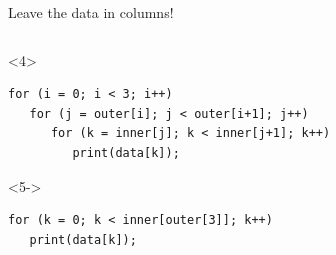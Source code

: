 \documentclass[aspectratio=169]{beamer}
\begin{document}
\begin{frame}[fragile]{Leave the data in columns!}
\begin{columns}[t]
\begin{uncoverenv}
\small
\vspace{-0.25 cm}
\begin{onlyenv}<4>
\begin{verbatim}
for (i = 0; i < 3; i++)
   for (j = outer[i]; j < outer[i+1]; j++)
      for (k = inner[j]; k < inner[j+1]; k++)
         print(data[k]);
\end{verbatim}
\end{onlyenv}
\begin{onlyenv}<5->
\begin{verbatim}
for (k = 0; k < inner[outer[3]]; k++)
   print(data[k]);
\end{verbatim}
\end{onlyenv}
\end{uncoverenv}
\end{columns}

\vspace{0.5 cm}
\end{frame}
\end{document}
